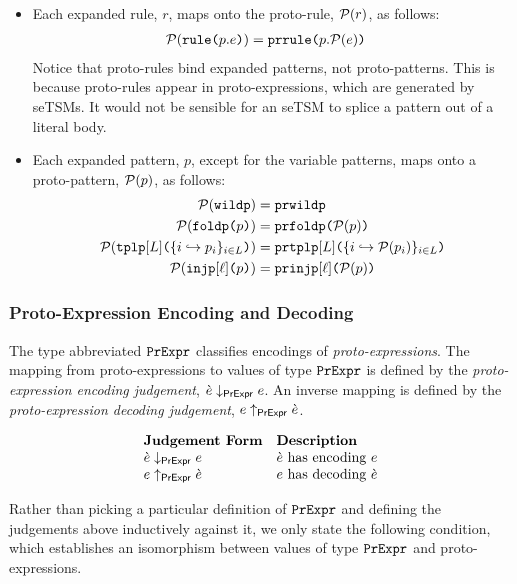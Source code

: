   \begin{grayparbox}
  \begin{itemize}
  \item Each expanded rule, $r$, maps onto the proto-rule, $\mathcal{P}(r)$, as follows:
  \begin{align*}
  \mathcal{P}(\texttt{rule}\texttt{(}p.e\texttt{)}) & = \texttt{prrule}\texttt{(}p.\mathcal{P}(e)\texttt{)}
  \end{align*}
  Notice that proto-rules bind expanded patterns, not proto-patterns. This is because proto-rules appear in proto-expressions, which are generated by seTSMs. It would not be sensible for an seTSM to splice a pattern out of a literal body.
  \item Each expanded pattern, $p$, except for the variable patterns, maps onto a proto-pattern, $\mathcal{P}(p)$, as follows:
  \begin{align*}
  \mathcal{P}(\texttt{wildp}) & = \texttt{prwildp}\\
  \mathcal{P}(\texttt{foldp}\texttt{(}p\texttt{)}) & = \texttt{prfoldp}\texttt{(}\mathcal{P}(p)\texttt{)}\\
  \mathcal{P}(\texttt{tplp}[L]\texttt{(}\{i \hookrightarrow p_{i}\}_{i \in L}\texttt{)}) & = \texttt{prtplp}[L]\texttt{(}\{i \hookrightarrow \mathcal{P}(p_{i})\}_{i \in L}\texttt{)}\\
  \mathcal{P}(\texttt{injp}[\ell]\texttt{(}p\texttt{)}) & = \texttt{prinjp}[\ell]\texttt{(}\mathcal{P}(p)\texttt{)}
  \end{align*}
\end{itemize}
\end{grayparbox}

\subsubsection{Proto-Expression Encoding and Decoding}
The type abbreviated $\mathtt{PrExpr}$ classifies encodings of \emph{proto-expressions}. The mapping from proto-expressions to values of type $\mathtt{PrExpr}$ is defined by the \emph{proto-expression encoding judgement}, $\grave{e} \downarrow_\mathsf{PrExpr} e$. An inverse mapping is defined by the \emph{proto-expression decoding judgement}, $e \uparrow_\mathsf{PrExpr} \grave{e}$.

\[\begin{array}{ll}
\textbf{Judgement Form} & \textbf{Description}\\
\grave{e} \downarrow_\mathsf{PrExpr} e & \text{$\grave{e}$ has encoding $e$}\\
e \uparrow_\mathsf{PrExpr} \grave{e} & \text{$e$ has decoding $\grave{e}$}
\end{array}\]

Rather than picking a particular definition of $\mathtt{PrExpr}$ and defining the judgements above inductively against it, we only state the following condition, which establishes an isomorphism between values of type $\mathtt{PrExpr}$ and proto-expressions.

